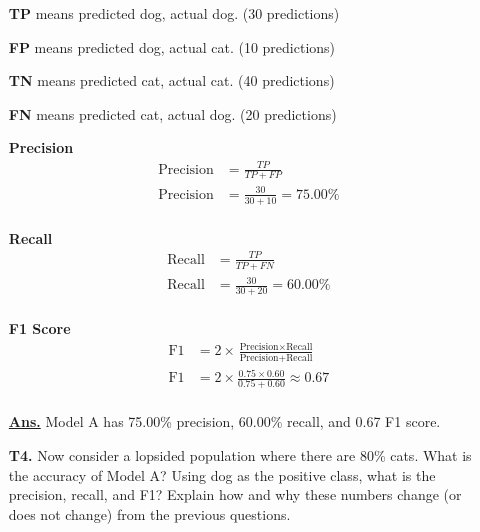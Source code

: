 \documentclass[12pt, a4paper]{article}
\newcommand{\ans}{\par\noindent\underline{\textbf{Ans.}} }
\begin{document}
\begin{enumerate}
            \textbf{TP} means predicted dog, actual dog. (30 predictions)

            \textbf{FP} means predicted dog, actual cat. (10 predictions)

            \textbf{TN} means predicted cat, actual cat. (40 predictions)

            \textbf{FN} means predicted cat, actual dog. (20 predictions)

            \vspace{1em}

            \noindent
            \begin{minipage}{0.5\textwidth}
                \centering
                \textbf{Precision}
                \begin{align*}
                    \text{Precision} &= \frac{TP}{TP + FP} \\[1em]
                    \text{Precision} &= \frac{30}{30 + 10} = 75.00\% \\[1em]
                \end{align*}
            \end{minipage}%
            \hfill
            \begin{minipage}{0.5\textwidth}
                \centering
                \textbf{Recall}
                \begin{align*}
                    \text{Recall} &= \frac{TP}{TP + FN} \\[1em]
                    \text{Recall} &= \frac{30}{30 + 20} = 60.00\% \\[1em]
                \end{align*}
            \end{minipage}
            \begin{minipage}{0.5\textwidth}
                \centering
                \textbf{F1 Score}
                \begin{align*}
                    \text{F1} &= 2 \times \frac{\text{Precision} \times \text{Recall}}{\text{Precision} + \text{Recall}} \\[1em]
                    \text{F1} &= 2 \times \frac{0.75 \times 0.60}{0.75 + 0.60} \approx 0.67 \\[1em]
                \end{align*}
            \end{minipage}
            \ans Model A has 75.00\% precision, 60.00\% recall, and 0.67 F1 score.
        \pagebreak

        \item[\textbf{T4.}] Now consider a lopsided population where there are 80\% cats. What is the accuracy of Model A? Using dog as the positive class, what is the precision, recall, and F1? Explain how and why these numbers change (or does not change) from the previous questions.


\end{enumerate}
\end{document}
